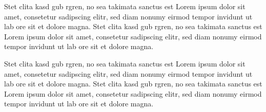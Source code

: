 Stet clita kasd gub rgren, no sea takimata sanctus est Lorem ipsum dolor sit amet, consetetur sadipscing elitr, sed diam nonumy eirmod tempor invidunt ut lab ore sit et dolore magna. Stet clita kasd gub rgren, no sea takimata sanctus est Lorem ipsum dolor sit amet, consetetur sadipscing elitr, sed diam nonumy eirmod tempor invidunt ut lab ore sit et dolore magna.
 
Stet clita kasd gub rgren, no sea takimata sanctus est Lorem ipsum dolor sit amet, consetetur sadipscing elitr, sed diam nonumy eirmod tempor invidunt ut lab ore sit et dolore magna. Stet clita kasd gub rgren, no sea takimata sanctus est Lorem ipsum dolor sit amet, consetetur sadipscing elitr, sed diam nonumy eirmod tempor invidunt ut lab ore sit et dolore magna. 
